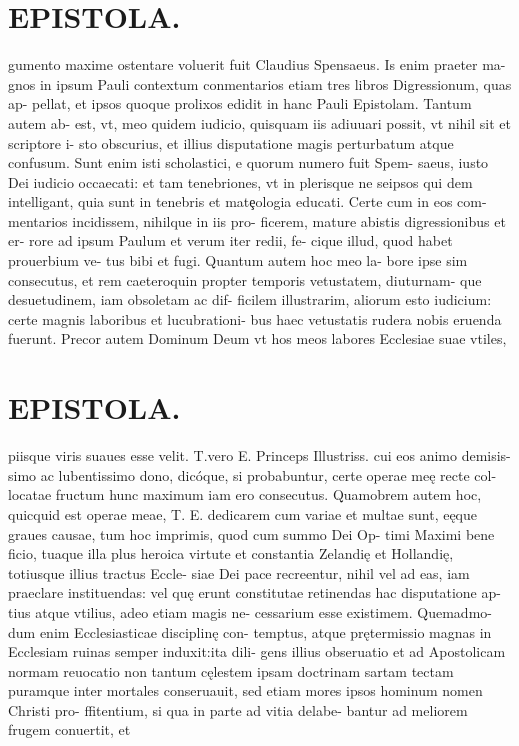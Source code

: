 \documentclass{article}
\begin{document}
\begin{pages}
\section*{EPISTOLA. }gumento maxime ostentare voluerit fuit Claudius Spensaeus. Is enim praeter ma- gnos in ipsum Pauli contextum conmentarios etiam tres libros Digressionum, quas ap- pellat, et ipsos quoque prolixos edidit in hanc Pauli Epistolam. Tantum autem ab- est, vt, meo quidem iudicio, quisquam iis adiuuari possit, vt nihil sit et scriptore i- sto obscurius, et illius disputatione magis perturbatum atque confusum. Sunt enim isti scholastici, e quorum numero fuit Spem- saeus, iusto Dei iudicio occaecati: et tam tenebriones, vt in plerisque ne seipsos qui dem intelligant, quia sunt in tenebris et matȩologia educati. Certe cum in eos com- mentarios incidissem, nihilque in iis pro- ficerem, mature abistis digressionibus et er- rore ad ipsum Paulum et verum iter redii, fe- cique illud, quod habet prouerbium ve- tus bibi et fugi. Quantum autem hoc meo la- bore ipse sim consecutus, et rem caeteroquin propter temporis vetustatem, diuturnam- que desuetudinem, iam obsoletam ac dif- ficilem illustrarim, aliorum esto iudicium: certe magnis laboribus et lucubrationi- bus haec vetustatis rudera nobis eruenda fuerunt. Precor autem Dominum Deum vt hos meos labores Ecclesiae suae vtiles, 
\section*{EPISTOLA. }piisque viris suaues esse velit. T.vero E. Princeps Illustriss. cui eos animo demisis- simo ac lubentissimo dono, dicóque, si probabuntur, certe operae meę recte col- locatae fructum hunc maximum iam ero consecutus. Quamobrem autem hoc, quicquid est operae meae, T. E. dedicarem cum variae et multae sunt, eęque graues causae, tum hoc imprimis, quod cum summo Dei Op- timi Maximi bene ficio, tuaque illa plus heroica virtute et constantia Zelandię et Hollandię, totiusque illius tractus Eccle- siae Dei pace recreentur, nihil vel ad eas, iam praeclare instituendas: vel quę erunt constitutae retinendas hac disputatione ap- tius atque vtilius, adeo etiam magis ne- cessarium esse existimem. Quemadmo- dum enim Ecclesiasticae disciplinę con- temptus, atque prętermissio magnas in Ecclesiam ruinas semper induxit:ita dili- gens illius obseruatio et ad Apostolicam normam reuocatio non tantum cęlestem ipsam doctrinam sartam tectam puramque inter mortales conseruauit, sed etiam mores ipsos hominum nomen Christi pro- ffitentium, si qua in parte ad vitia delabe- bantur ad meliorem frugem conuertit, et 

\end{pages}
\end{document}
